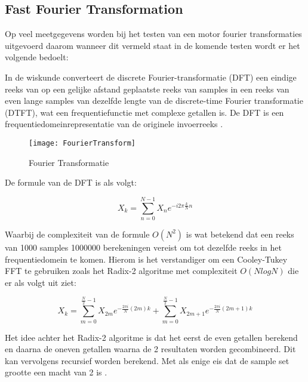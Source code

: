 \newpage

\subsection{Fast Fourier Transformation}

Op veel meetgegevens worden bij het testen van een motor fourier transformaties uitgevoerd daarom wanneer dit vermeld staat in de komende testen wordt er het volgende bedoelt:

\vspace{0.5cm}

In de wiskunde converteert de discrete Fourier-transformatie (\gls{DFT}) een eindige reeks van op een gelijke afstand geplaatste reeks van samples in een reeks van even lange samples van dezelfde lengte van de discrete-time Fourier transformatie (\gls{DTFT}), wat een frequentiefunctie met complexe getallen is. De \gls{DFT} is een frequentiedomeinrepresentatie van de originele invoerreeks \cite{web:FFT}.


\begin{figure}[H]
	\centering
	\texttt{[image: FourierTransform]}
	\label{fig:FourierTransformatie}
	\caption{Fourier Transformatie \cite{web:FFT}}
\end{figure}

De formule van de \gls{DFT} is als volgt:

\begin{equation}
	X_k = \sum_{n=0}^{N-1}X_n e^{-i2\pi\frac{k}{N}n}
\end{equation}

Waarbij de complexiteit van de formule $O\left(N^2\right)$ is wat betekend dat een reeks van 1000 samples 1000000 berekeningen vereist om tot dezelfde reeks in het frequentiedomein te komen. Hierom is het verstandiger om een Cooley-Tukey FFT te gebruiken zoals het Radix-2 algoritme met complexiteit $O\left(Nlog{N}\right)$ die er als volgt uit ziet:

\begin{equation}
	X_k = {\sum_{m=0}^{\frac{N}{2}-1}X_{2m}e^{-\frac{2\pi i}{N}(2m)k}} + {\sum_{m=0}^{\frac{N}{2}-1}X_{2m+1}e^{-\frac{2\pi i}{N}(2m+1)k}}
\end{equation}

\newpage

Het idee achter het Radix-2 algoritme is dat het eerst de even getallen berekend en daarna de oneven getallen waarna de 2 resultaten worden gecombineerd. Dit kan vervolgens recursief worden berekend. Met als enige eis dat de sample set grootte een macht van 2 is \cite{web:Radix-2FFT}.

